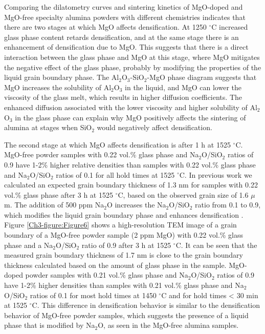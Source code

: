 Comparing the dilatometry curves and sintering kinetics of MgO-doped and MgO-free specialty alumina powders with different chemistries indicates that there are two stages at which MgO affects densification. At 1250 $^{\circ}$C increased glass phase content retards densification, and at the same stage there is an enhancement of densification due to MgO. This suggests that there is a direct interaction between the glass phase and MgO at this stage, where MgO mitigates the negative effect of the glass phase, probably by modifying the properties of the liquid grain boundary phase. The Al$_{2}$O$_{3}$-SiO$_{2}$-MgO phase diagram suggests that MgO increases the solubility of Al$_{2}$O$_{3}$ in the liquid, and MgO can lower the viscosity of the glass melt, \cite{Wu2015} which results in higher diffusion coefficients. The enhanced diffusion associated with the lower viscosity and higher solubility of Al$_{2}$O$_{3}$ in the glass phase can explain why MgO positively affects the sintering of alumina at stages when SiO$_{2}$ would negatively affect densification. 

The second stage at which MgO affects densification is after 1 h at 1525 $^{\circ}$C. MgO-free powder samples with 0.22 vol.\% glass phase and Na$_{2}$O/SiO$_{2}$ ratios of 0.9 have 1-2\% higher relative densities than samples with 0.22 vol.\% glass phase and Na$_{2}$O/SiO$_{2}$ ratios of 0.1 for all hold times at 1525 $^{\circ}$C. In previous work we calculated an expected grain boundary thickness of 1.3 nm for samples with 0.22 vol.\% glass phase after 3 h at 1525 $^{\circ}$C, based on the observed grain size of 1.6 $\mu$m. The addition of 500 ppm Na$_{2}$O increases the Na$_{2}$O/SiO$_{2}$ ratio from 0.1 to 0.9, which modifies the liquid grain boundary phase and enhances densification \cite{Frueh2016}. Figure \ref{Ch3-figure:Figure6} shows a high-resolution TEM image of a grain boundary of a MgO-free powder \cite{Frueh2016} sample (2 ppm MgO) with 0.22 vol.\% glass phase and a Na$_{2}$O/SiO$_{2}$ ratio of 0.9 after 3 h at 1525 $^{\circ}$C. It can be seen that the measured grain boundary thickness of 1.7 nm is close to the grain boundary thickness calculated based on the amount of glass phase in the sample. MgO-doped powder samples with 0.21 vol.\% glass phase and Na$_{2}$O/SiO$_{2}$ ratios of 0.9 have 1-2\% higher densities than samples with 0.21 vol.\% glass phase and Na$_{2}$O/SiO$_{2}$ ratios of 0.1 for most hold times at 1450 $^{\circ}$C and for hold times < 30 min at 1525 $^{\circ}$C. This difference in densification behavior is similar to the densification behavior of MgO-free powder samples, which suggests the presence of a liquid phase that is modified by Na$_{2}$O, as seen in the MgO-free alumina samples. 

